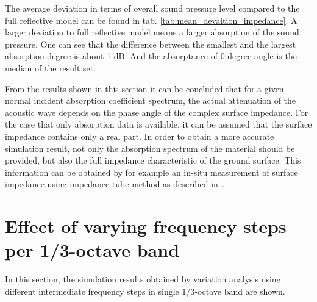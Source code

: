 \noindent The average deviation in terms of overall sound pressure level compared to the full reflective model can be found in tab. \ref{tab:mean_devaition_impedance}. A larger deviation to full reflective model means a larger absorption of the sound pressure. One can see that the difference between the smallest and the largest absorption degree is about 1 dB. And the absorptance of 0-degree angle is the median of the result set.

From the results shown in this section it can be concluded that for a given normal incident absorption coefficient spectrum, the actual attenuation of the acoustic wave depends on the phase angle of the complex surface impedance. For the case that only absorption data is available, it can be assumed that the surface impedance contains only a real part. In order to obtain a more accurate simulation result, not only the absorption spectrum of the material should be provided, but also the full impedance characteristic of the ground surface. This information can be obtained by for example an in-situ measurement of surface impedance using impedance tube method as described in \cite{hald_situ_2019, wolkesson_2013}.

\section{Effect of varying frequency steps per 1/3-octave band}

In this section, the simulation results obtained by variation analysis using different intermediate frequency steps in single 1/3-octave band are shown.


